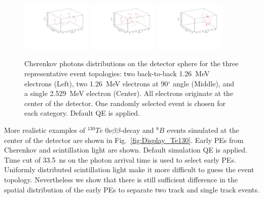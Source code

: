 \documentclass[12pt,twoside,letterpaper]{article}
\newcommand{\vbb}{0\nu\beta\beta}
\newcommand{\Te}{^{130}Te}
\newcommand{\B}{^{8}B}
\begin{document}
\begin{figure}[htb]
\centering
\includegraphics[angle=0,width=0.3\textwidth]{plots/hDisplay_topology180_2p529MeVTot}
\includegraphics[angle=0,width=0.3\textwidth]{plots/hDisplay_topology90_2p529MeVTot}
\includegraphics[angle=0,width=0.3\textwidth]{plots/hDisplay_1el_2p529MeV}
\caption{Cherenkov photons distributions on the detector sphere for the three representative event topologies: two back-to-back 1.26~MeV electrons (Left), two 1.26~MeV electrons at 90$^{\circ}$ angle (Middle), and a single 2.529~MeV electron (Center).  All electrons originate at the center of the detector. One randomly selected event is chosen for each category. Default QE is applied.}
\label{fig:Display_top_2p5MeV}
\end{figure}

More realistic examples of $\Te$ $\vbb$-decay and $\B$ events simulated at the center of the detector are shown in Fig.~\ref{fig:Display_Te130}. Early PEs from Cherenkov and scintillation light are shown. Default simulation QE is applied. Time cut of 33.5~ns on the photon arrival time is used to select early PEs. Uniformly distributed scintillation light make it more difficult to guess the event topology. Nevertheless we show that there is still sufficient difference in the spatial distribution of the early PEs to separate two track and single track events.
\end{document}

